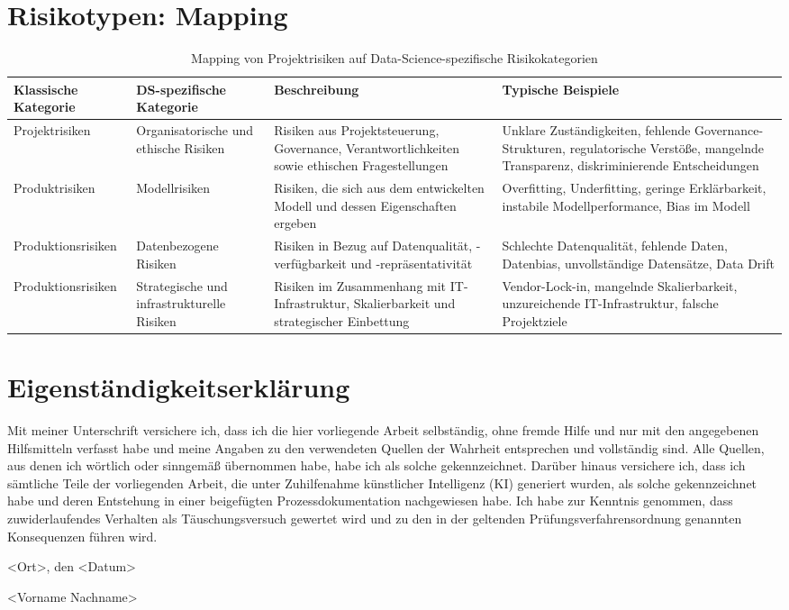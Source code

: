\section{Risikotypen: Mapping}
\begin{table}[h]
\centering
\caption{Mapping von Projektrisiken auf Data-Science-spezifische Risikokategorien}
\label{tab:risk_mapping}
\begin{tabular}{p{3cm} p{3.5cm} p{4cm} p{5cm}}
\hline
\textbf{Klassische Kategorie} & \textbf{DS-spezifische Kategorie} & \textbf{Beschreibung} & \textbf{Typische Beispiele} \\
\hline

Projektrisiken 
& Organisatorische und ethische Risiken 
& Risiken aus Projektsteuerung, Governance, Verantwortlichkeiten sowie ethischen Fragestellungen 
& Unklare Zuständigkeiten, fehlende Governance-Strukturen, regulatorische Verstöße, mangelnde Transparenz, diskriminierende Entscheidungen \\

\hline

Produktrisiken 
& Modellrisiken 
& Risiken, die sich aus dem entwickelten Modell und dessen Eigenschaften ergeben 
& Overfitting, Underfitting, geringe Erklärbarkeit, instabile Modellperformance, Bias im Modell \\

\hline

Produktionsrisiken 
& Datenbezogene Risiken 
& Risiken in Bezug auf Datenqualität, -verfügbarkeit und -repräsentativität 
& Schlechte Datenqualität, fehlende Daten, Datenbias, unvollständige Datensätze, Data Drift \\

\hline

Produktionsrisiken 
& Strategische und infrastrukturelle Risiken 
& Risiken im Zusammenhang mit IT-Infrastruktur, Skalierbarkeit und strategischer Einbettung 
& Vendor-Lock-in, mangelnde Skalierbarkeit, unzureichende IT-Infrastruktur, falsche Projektziele \\

\hline

\end{tabular}
\end{table}

\section{Eigenständigkeitserklärung} 
Mit meiner Unterschrift versichere ich, dass ich die hier vorliegende Arbeit selbständig, ohne 
fremde Hilfe und nur mit den angegebenen Hilfsmitteln verfasst habe und meine Angaben zu 
den verwendeten Quellen der Wahrheit entsprechen und vollständig sind. Alle Quellen, aus 
denen ich wörtlich oder sinngemäß übernommen habe, habe ich als solche gekennzeichnet.   
Darüber hinaus versichere ich, dass ich sämtliche Teile der vorliegenden Arbeit, die unter 
Zuhilfenahme künstlicher Intelligenz (KI) generiert wurden, als solche gekennzeichnet habe und 
deren Entstehung in einer beigefügten Prozessdokumentation nachgewiesen habe.  
Ich habe zur Kenntnis genommen, dass zuwiderlaufendes Verhalten als Täuschungsversuch 
gewertet wird und zu den in der geltenden Prüfungsverfahrensordnung genannten 
Konsequenzen führen wird. 


<Ort>, den <Datum>  



<Vorname Nachname> 
